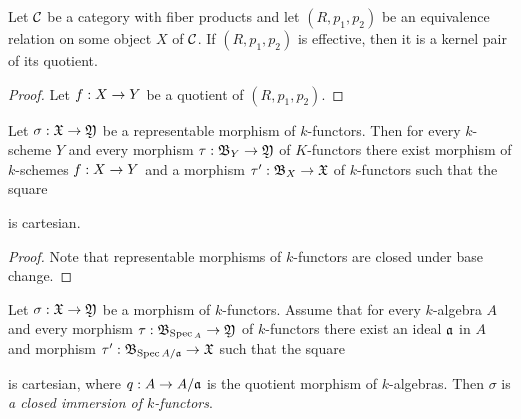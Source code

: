 \begin{proposition}
Let ${\mathcal C}$ be a category with fiber products and let $(R,p_1,p_2)$ be an equivalence relation on some object $X$ of ${\mathcal C}$. If $(R,p_1,p_2)$ is effective, then it is a kernel pair of its quotient.
\end{proposition}
\begin{proof}
Let $f:X\rightarrow Y$ be a quotient of $(R,p_1,p_2)$.
\end{proof}

\begin{proposition}
Let $\sigma:{\mathfrak X}\rightarrow {\mathfrak Y}$ be a representable morphism of $k$-functors. Then for every $k$-scheme $Y$ and every morphism $\tau:{\mathfrak B}_Y\rightarrow {\mathfrak Y}$ of $K$-functors there exist morphism of $k$-schemes $f:X\rightarrow Y$ and a morphism $\tau':{\mathfrak B}_X\rightarrow {\mathfrak X}$ of $k$-functors such that the square 
\begin{center}
\end{center}
is cartesian.
\end{proposition}
\begin{proof}
Note that representable morphisms of $k$-functors are closed under base change.
\end{proof}

\begin{definition}
Let $\sigma:{\mathfrak X}\rightarrow {\mathfrak Y}$ be a morphism of $k$-functors. Assume that for every $k$-algebra $A$ and every morphism $\tau:{\mathfrak B}_{\mathrm{Spec}\,_A}\rightarrow {\mathfrak Y}$ of $k$-functors there exist an ideal $\mathfrak{a}$ in $A$ and morphism $\tau':{\mathfrak B}_{\mathrm{Spec}\, A/\mathfrak{a}}\rightarrow {\mathfrak X}$ such that the square
\begin{center}
\end{center}
is cartesian, where $q:A\rightarrow A/\mathfrak{a}$ is the quotient morphism of $k$-algebras. Then $\sigma$ is \textit{a closed immersion of $k$-functors}.
\end{definition}

